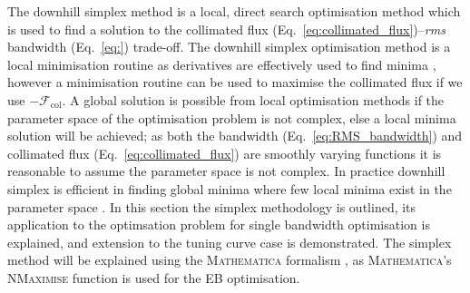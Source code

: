 \documentclass[../main.tex]{subfiles}
\begin{document}
The downhill simplex method is a local, direct search optimisation method which is used to find a solution to the collimated flux (Eq.~\ref{eq:collimated_flux})--\textit{rms} bandwidth (Eq.~\ref{eq:}) trade-off. The downhill simplex optimisation method is a local minimisation routine as derivatives are effectively used to find minima \cite{jones2016design}, however a minimisation routine can be used to maximise the collimated flux if we use $-\mathcal{F}_{\mathrm{col}}$. A global solution is possible from local optimisation methods if the parameter space of the optimisation problem is not complex, else a local minima solution will be achieved; as both the bandwidth (Eq.~\ref{eq:RMS_bandwidth}) and collimated flux (Eq.~\ref{eq:collimated_flux}) are smoothly varying functions it is reasonable to assume the parameter space is not complex. In practice downhill simplex is efficient in finding global minima where few local minima exist in the parameter space \cite{wolfram2021nmaximize}. In this section the simplex methodology is outlined, its application to the optimsation problem for single bandwidth optimisation is explained, and extension to the tuning curve case is demonstrated. The simplex method will be explained using the \textsc{Mathematica} formalism \cite{wolfram2021nmaximize}, as \textsc{Mathematica}'s \textsc{NMaximise} function is used for the EB optimisation.
\end{document}
